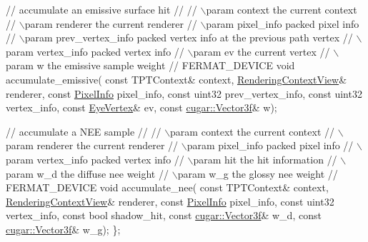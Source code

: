 \begin{DoxyParagraph}{}
\begin{DoxyEnumerate}
\begin{DoxyCode}
  \textcolor{comment}{// accumulate an emissive surface hit}
  \textcolor{comment}{//}
  \textcolor{comment}{// \(\backslash\)param context               the current context}
  \textcolor{comment}{// \(\backslash\)param renderer              the current renderer}
  \textcolor{comment}{// \(\backslash\)param pixel\_info            packed pixel info}
  \textcolor{comment}{// \(\backslash\)param prev\_vertex\_info      packed vertex info at the previous path vertex}
  \textcolor{comment}{// \(\backslash\)param vertex\_info           packed vertex info}
  \textcolor{comment}{// \(\backslash\)param ev                    the current vertex}
  \textcolor{comment}{// \(\backslash\)param w                     the emissive sample weight}
  \textcolor{comment}{//}
  FERMAT\_DEVICE
  \textcolor{keywordtype}{void} accumulate\_emissive(
      \textcolor{keyword}{const} TPTContext&           context,
            \hyperlink{struct_rendering_context_view}{RenderingContextView}& renderer,
      \textcolor{keyword}{const} \hyperlink{union_pixel_info}{PixelInfo}             pixel\_info,
      \textcolor{keyword}{const} uint32                prev\_vertex\_info,
      \textcolor{keyword}{const} uint32                vertex\_info,
      \textcolor{keyword}{const} \hyperlink{struct_eye_vertex}{EyeVertex}&            ev,
      \textcolor{keyword}{const} \hyperlink{structcugar_1_1_vector}{cugar::Vector3f}&      w);


  \textcolor{comment}{// accumulate a NEE sample}
  \textcolor{comment}{//}
  \textcolor{comment}{// \(\backslash\)param context               the current context}
  \textcolor{comment}{// \(\backslash\)param renderer              the current renderer}
  \textcolor{comment}{// \(\backslash\)param pixel\_info            packed pixel info}
  \textcolor{comment}{// \(\backslash\)param vertex\_info           packed vertex info}
  \textcolor{comment}{// \(\backslash\)param hit                   the hit information}
  \textcolor{comment}{// \(\backslash\)param w\_d                   the diffuse nee weight}
  \textcolor{comment}{// \(\backslash\)param w\_g                   the glossy nee weight}
  \textcolor{comment}{//}
  FERMAT\_DEVICE
  \textcolor{keywordtype}{void} accumulate\_nee(
      \textcolor{keyword}{const} TPTContext&           context,
            \hyperlink{struct_rendering_context_view}{RenderingContextView}& renderer,
      \textcolor{keyword}{const} \hyperlink{union_pixel_info}{PixelInfo}             pixel\_info,
      \textcolor{keyword}{const} uint32                vertex\_info,
      \textcolor{keyword}{const} \textcolor{keywordtype}{bool}                  shadow\_hit,
      \textcolor{keyword}{const} \hyperlink{structcugar_1_1_vector}{cugar::Vector3f}&      w\_d,
      \textcolor{keyword}{const} \hyperlink{structcugar_1_1_vector}{cugar::Vector3f}&      w\_g);
\};
\end{DoxyCode}
 ~\newline
\label{_p_t_lib_page_TPTDirectLightingSampler}%
%


\end{DoxyEnumerate}
\end{DoxyParagraph}
